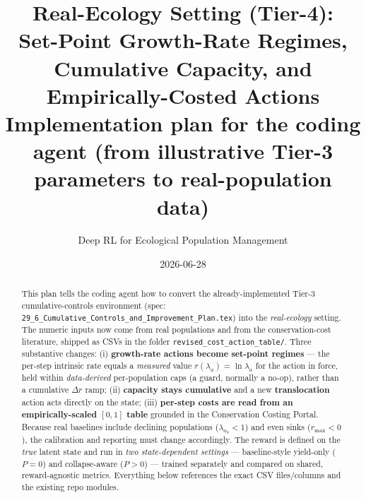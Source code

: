 \documentclass[11pt]{article}
\title{Real-Ecology Setting (Tier-4):\\
Set-Point Growth-Rate Regimes, Cumulative Capacity, and Empirically-Costed Actions\\
\large Implementation plan for the coding agent
(from illustrative Tier-3 parameters to real-population data)}
\author{Deep RL for Ecological Population Management}
\date{2026-06-28}
\newcommand{\rmax}{r_{\max}}
\newcommand{\code}[1]{\texttt{#1}}
\begin{document}
\maketitle

\begin{abstract}
This plan tells the coding agent how to convert the already-implemented Tier-3
cumulative-controls environment (spec: \code{29\_6\_Cumulative\_Controls\_and\_Improvement\_Plan.tex})
into the \emph{real-ecology} setting. The numeric inputs now come from real
populations and from the conservation-cost literature, shipped as CSVs in the
folder \code{revised\_cost\_action\_table/}. Three substantive changes: (i)
\textbf{growth-rate actions become set-point regimes} --- the per-step intrinsic
rate equals a \emph{measured} value $r(\lambda_a)=\ln\lambda_a$ for the action in
force, held within \emph{data-derived} per-population caps (a guard, normally a no-op), rather than a cumulative
$\Delta r$ ramp; (ii) \textbf{capacity stays cumulative} and a new
\textbf{translocation} action acts directly on the state; (iii) \textbf{per-step
costs are read from an empirically-scaled $[0,1]$ table} grounded in the
Conservation Costing Portal. Because real baselines include declining populations
($\lambda_{a_0}<1$) and even sinks ($\rmax<0$), the calibration and reporting must
change accordingly. The reward is defined on the \emph{true} latent state and run in
\emph{two state-dependent settings} --- baseline-style yield-only ($P{=}0$) and
collapse-aware ($P{>}0$) --- trained separately and compared on shared, reward-agnostic
metrics. Everything below references the exact CSV files/columns and the existing repo
modules.
\end{abstract}
\end{document}
